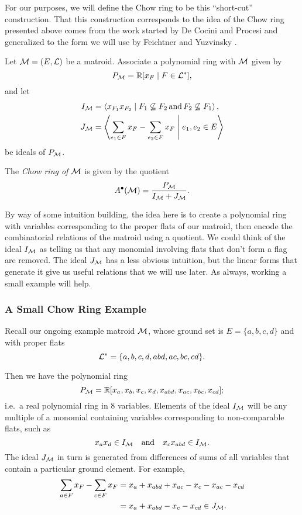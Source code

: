 \documentclass[12pt,oneside]{../../sfsuthesis}
\begin{document}
For our purposes, we will define the Chow ring to be this ``short-cut'' construction.
That this construction corresponds to the idea of the Chow ring presented above comes from the work started by De Cocini and Procesi \cite{deconciniWonderfulModelsSubspace1995} and generalized to the form we will use by Feichtner and Yuzvinsky \cite{feichtnerChowRingsToric2004}.
\begin{definition}\label{def:chowRing}
    Let \( \mathcal{M} = (E, \mathcal{L})\) be a matroid.
    Associate a polynomial ring with \( \mathcal{M} \) given by
    \[
        P_{\mathcal{M}} = \mathbb{R}[x_F \; | \; F \in \mathcal{L}^\ast],
    \]
    and let
    \begin{align*}
        I_{\mathcal{M}} & = \left\langle x_{F_1}x_{F_2} \; \middle| \; F_1 \not\subseteq F_2\, \text{and}\, F_2 \not\subseteq F_1 \right\rangle, \\
        J_{\mathcal{M}} & = \left\langle \sum_{e_1 \in F} x_{F} - \sum_{e_2 \in F} x_{F} \; \middle| \; e_1, e_2 \in E \right\rangle
    \end{align*}
    be ideals of \(P_{\mathcal{M}}\).

    The \emph{Chow ring of \( \mathcal{M} \)} is given by the quotient
    \[
        A^{\bullet}(\mathcal{M}) = \frac{P_{\mathcal{M}}}{I_{\mathcal{M}} + J_{\mathcal{M}}}.
    \]
\end{definition}

By way of some intuition building, the idea here is to create a polynomial ring with variables corresponding to the proper flats of our matroid, then encode the combinatorial relations of the matroid using a quotient.
We could think of the ideal \( I_{\mathcal{M}} \) as telling us that any monomial involving flats that don't form a flag are removed.
The ideal \( J_{\mathcal{M}} \) has a less obvious intuition, but the linear forms that generate it give us useful relations that we will use later.
As always, working a small example will help.

\subsubsection{A Small Chow Ring Example}
Recall our ongoing example matroid \( \mathcal{M} \), whose ground set is \( E = \{ a,b,c,d \} \) and with proper flats
\[
    \mathcal{L}^\ast = \{ a, b, c, d, abd, ac, bc, cd \}.
\]

Then we have the polynomial ring
\[
    P_{\mathcal{M}} = \mathbb{R}[x_{a}, x_{b}, x_{c}, x_{d}, x_{abd}, x_{ac}, x_{bc}, x_{cd}];
\]
i.e.\ a real polynomial ring in 8 variables.
Elements of the ideal \( I_{\mathcal{M}} \) will be any multiple of a monomial containing variables corresponding to non-comparable flats, such as
\[
    x_a x_d \in I_{\mathcal{M}} \quad \text{and} \quad x_c x_{abd} \in I_{\mathcal{M}}.
\]
The ideal \( J_{\mathcal{M}} \) in turn is generated from differences of sums of all variables that contain a particular ground element. For example,
\begin{align*}
    \sum_{a \in F}x_F - \sum_{c \in F}x_F & = x_a + x_{abd} + x_{ac} - x_c - x_{ac} - x_{cd} \\
                                          & = x_a + x_{abd} - x_c - x_{cd} \in J_{\mathcal{M}}.
\end{align*}
\end{document}
